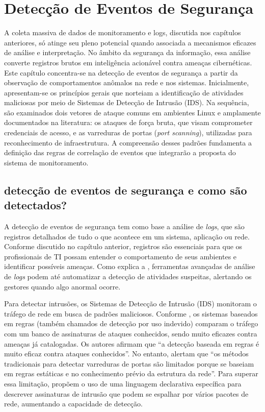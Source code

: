 \documentclass[
    12pt
    ,oneside
    ,a4paper
    ,chapter=TITLE
    ,section=TITLE
    ,sumario=abnt-6027-2012]{abntex2}
\begin{document}
\chapter{Detecção de Eventos de Segurança}
\label{cap:detection}

A coleta massiva de dados de monitoramento e logs, discutida nos capítulos anteriores, só atinge seu pleno potencial quando associada a mecanismos eficazes de análise e interpretação. No âmbito da segurança da informação, essa análise converte registros brutos em inteligência acionável contra ameaças cibernéticas. Este capítulo concentra-se na detecção de eventos de segurança a partir da observação de comportamentos anômalos na rede e nos sistemas. Inicialmente, apresentam-se os princípios gerais que norteiam a identificação de atividades  maliciosas por meio de Sistemas de Detecção de Intrusão (IDS). Na sequência, são examinados dois vetores de ataque comuns em ambientes Linux e amplamente documentados na literatura: os ataques de força bruta, que visam comprometer credenciais de acesso, e as varreduras de portas (\textit{port scanning}), utilizadas para reconhecimento de infraestrutura. A compreensão desses padrões fundamenta a definição das regras de correlação de eventos que integrarão a proposta do sistema de monitoramento.

\section{detecção de eventos de segurança e como são detectados?}

A detecção de eventos de segurança tem como base a análise de \textit{logs}, que são registros detalhados de tudo o que acontece em um sistema, aplicação ou rede. Conforme discutido no capítulo anterior, registros são essenciais para que os profissionais de TI possam entender o comportamento de seus ambientes e identificar possíveis ameaças. Como explica a , ferramentas avançadas de análise de \textit{logs} podem até automatizar a detecção de atividades suspeitas, alertando os gestores quando algo anormal ocorre.

Para detectar intrusões, os Sistemas de Detecção de Intrusão (IDS) monitoram o tráfego de rede em busca de padrões maliciosos. Conforme , os sistemas baseados em regras (também chamados de detecção por uso indevido) comparam o tráfego com um banco de assinaturas de ataques conhecidos, sendo muito eficazes contra ameaças já catalogadas. Os autores afirmam que “a detecção baseada em regras é muito eficaz contra ataques conhecidos”. No entanto,  alertam que “os métodos tradicionais para detectar varreduras de portas são limitados porque se baseiam em regras estáticas e no conhecimento prévio da estrutura da rede”. Para superar essa limitação,  propõem o uso de uma linguagem declarativa específica para descrever assinaturas de intrusão que podem se espalhar por vários pacotes de rede, aumentando a capacidade de detecção.
\end{document}

